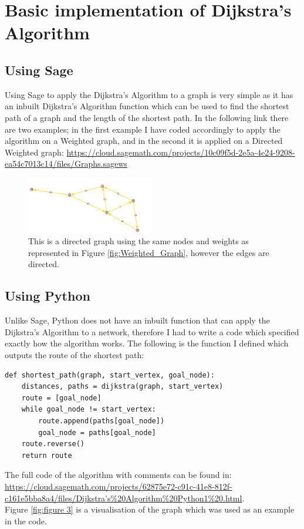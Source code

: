 \documentclass[a4paper]{article}
\begin{document}
\section{Basic implementation of Dijkstra's Algorithm}

\subsection{Using Sage}
Using Sage to apply the Dijkstra's Algorithm to a graph is very simple as it has an inbuilt Dijkstra's Algorithm function which can be used to find the shortest path of a graph and the length of the shortest path. In the following link there are two examples; in the first example I have coded accordingly to apply the algorithm on a Weighted graph, and in the second it is applied on a Directed Weighted graph:
\url{https://cloud.sagemath.com/projects/10c09f5d-2e5a-4e24-9208-ea54c7013c14/files/Graphs.sagews}

\begin{figure}[ht]
\centering
\includegraphics[width=0.5\textwidth,]{DiGraph1.pdf}
\caption{\label{fig:DiGraph}This is a directed graph using the same nodes and weights as represented in Figure \ref{fig:Weighted_Graph}, however the edges are directed.}
\end{figure}

\subsection{Using Python}
Unlike Sage, Python does not have an inbuilt function that can apply the Dijkstra's Algorithm to a network, therefore I had to write a code which specified exactly how the algorithm works. The following is the function I defined which outputs the route of the shortest path:
\begin{verbatim}
def shortest_path(graph, start_vertex, goal_node):
    distances, paths = dijkstra(graph, start_vertex)
    route = [goal_node]
    while goal_node != start_vertex:
        route.append(paths[goal_node])
        goal_node = paths[goal_node]
    route.reverse()
    return route
\end{verbatim}
The full code of the algorithm with comments can be found in: \url{https://cloud.sagemath.com/projects/62875e72-c91c-41e8-812f-c161e5bba8a4/files/Dijkstra's%20Algorithm%20Python1%20.html}. 
\\ Figure \ref{fig:figure 3} is a visualisation of the graph which was used as an example in the code.
\end{document}
